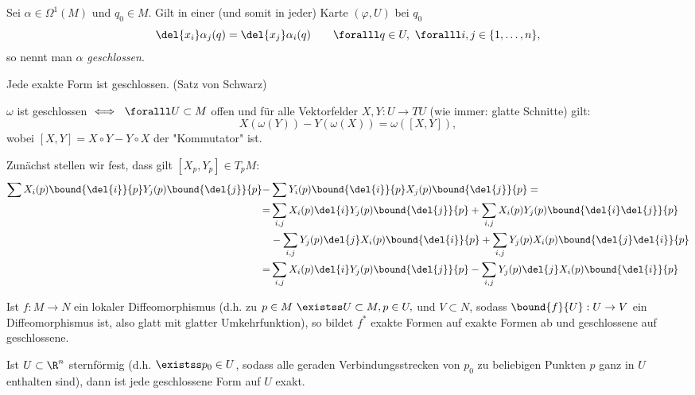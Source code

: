 \begin{defn}
	Sei $ \alpha \in \Omega^1(M) $ und $q_0 \in M$. Gilt in einer (und somit in jeder) Karte $ (\varphi,U)$ bei $ q_0 $
	\[ \del{x_i} \alpha_j (q) = \del{x_j} \alpha_i(q) \qquad \foralll q \in U,\ \foralll i,j \in \{1,\dotsc,n\}, \]
	so nennt man $\alpha$ \emph{geschlossen}.
\end{defn}

\begin{rem*}
	Jede exakte Form ist geschlossen. (Satz von Schwarz)
\end{rem*}

\begin{lem}
	$\omega$ ist geschlossen $\iff \ \foralll U \subset M$ offen und für alle Vektorfelder $X,Y: U \to TU$ (wie immer: glatte Schnitte) gilt:
	\[ X(\omega(Y)) - Y(\omega(X)) = \omega([X,Y]), \]
	wobei $[X,Y] = X \circ Y - Y \circ X$ der "Kommutator" ist.
\end{lem}

\begin{rem*}
	Zunächst stellen wir fest, dass gilt $ [X_p,Y_p] \in T_pM: $
	\begin{align*}
		\sum X_i(p) \bound{\del{i}}{p} Y_j(p) \bound{\del{j}}{p} -& \sum Y_i(p) \bound{\del{i}}{p} X_j(p) \bound{\del{j}}{p} = \\
		=&\sum_{i,j} X_i(p) \del{i} Y_j(p) \bound{\del{j}}{p} + \sum_{i,j} X_i(p) Y_j(p) \bound{\del{i} \del{j}}{p}\\
		&- \sum_{i,j} Y_j(p) \del{j} X_i(p) \bound{\del{i}}{p} + \sum_{i,j} Y_j(p) X_i(p) \bound{\del{j} \del{i}}{p}\\
		=& \sum_{i,j} X_i(p) \del{i} Y_j(p) \bound{\del{j}}{p} - \sum_{i,j} Y_j(p) \del{j} X_i(p) \bound{\del{i}}{p}
	\end{align*}
\end{rem*}

\begin{rem}
	Ist $ f: M \to N $ ein lokaler Diffeomorphismus (d.h. zu $p \in M \ \existss U \subset M, p \in U,$ und $V \subset N$, sodass $ \bound{f}{U}: U \to V $ ein Diffeomorphismus ist, also glatt mit glatter Umkehrfunktion), so bildet $f^*$ exakte Formen auf exakte Formen ab und geschlossene auf geschlossene.
\end{rem}

\begin{thm}
	\begin{minipage}{\linewidth}
		\begin{wrapfigure}{R}{5cm}
			\centering
		\end{wrapfigure}
		
		Ist $ U \subset \R^n $ sternförmig (d.h. $\existss p_0 \in U$, sodass alle geraden Verbindungsstrecken von $p_0$ zu beliebigen Punkten $p$ ganz in $U$ enthalten sind), dann ist jede geschlossene Form auf $U$ exakt.
	\end{minipage}
\end{thm}

